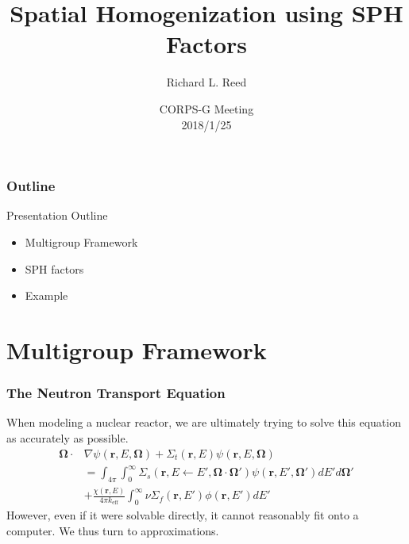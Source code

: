 \documentclass[fleqn]{beamer}
\title[SPH Demo]{
    Spatial Homogenization using SPH Factors}
\author[Reed]{
    Richard L. Reed}
\institute[Kansas State University]{
    Mechanical and Nuclear Engineering \\
    Kansas State University}
\date[CORPS-G Meeting]{
    CORPS-G Meeting \\
    2018/1/25}
\renewcommand{\vec}[1]{\ensuremath{\bm{#1}}}
\begin{document}
    \begin{frame}
        \titlepage
    \end{frame}

    \begin{frame}
        \frametitle{Outline}
        \begin{block}{Presentation Outline}
            \begin{itemize}
                \item Multigroup Framework
                \item SPH factors
                \item Example
            \end{itemize}
        \end{block}
    \end{frame}

    \section{Multigroup Framework}

    \begin{frame}
        \frametitle{The Neutron Transport Equation}
        \centering
        \begin{block}{}
            When modeling a nuclear reactor, we are ultimately trying to solve this equation as accurately as possible.
            \begin{align*}
                \vec{\Omega}\cdot&\nabla\psi(\vec{r},E,\vec{\Omega})
                +\Sigma_t(\vec{r},E)\psi(\vec{r},E,\vec{\Omega})\\
                &=\int_{4\pi}\int_0^\infty\Sigma_s(\vec{r},E\leftarrow E',\vec{\Omega}\cdot\vec{\Omega}')\psi(\vec{r},E',\vec{\Omega'})dE'd\vec{\Omega}'\\
                &+\frac{\chi(\vec{r},E)}{4\pi k_{\text{eff}}}\int_0^\infty\nu\Sigma_f(\vec{r},E')\phi(\vec{r},E')dE'
            \end{align*}
            However, even if it were solvable directly, it cannot reasonably fit onto a computer.
            We thus turn to approximations.
        \end{block}
    \end{frame}
\end{document}
